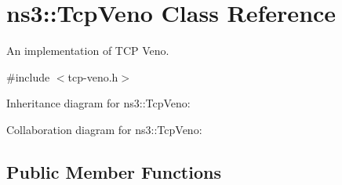 \hypertarget{classns3_1_1TcpVeno}{}\section{ns3\+:\+:Tcp\+Veno Class Reference}
\label{classns3_1_1TcpVeno}


An implementation of T\+CP Veno.  




{\ttfamily \#include $<$tcp-\/veno.\+h$>$}



Inheritance diagram for ns3\+:\+:Tcp\+Veno\+:


Collaboration diagram for ns3\+:\+:Tcp\+Veno\+:
\subsection*{Public Member Functions}
